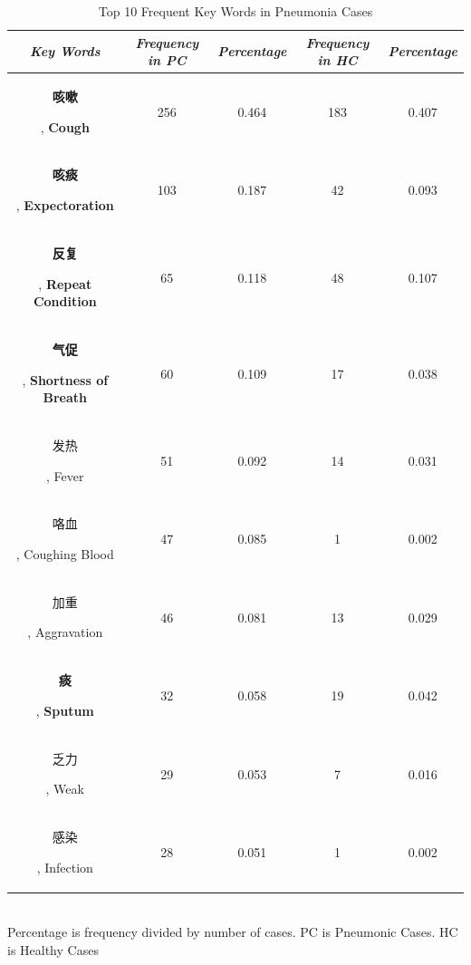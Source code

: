 \documentclass[journal]{IEEEtran}
\begin{document}
\begin{table}[htb]
\vspace{-0cm}
\caption{Top 10 Frequent Key Words in Pneumonia Cases}
\vspace{-0cm}
\begin{center}
\begin{tabular}{|c|c|c|c|c|}
    \hline
    \textbf{\textit{Key Words}} & \textbf{\textit{Frequency in PC}} & \textbf{\textit{Percentage}}& \textbf{\textit{Frequency in HC}}& \textbf{\textit{Percentage}} \\
\hline
\begin{CJK}{UTF8}{gbsn}\textbf{咳嗽}\end{CJK}, \textbf{Cough} & 256 & 0.464 & 183 & 0.407\\
\begin{CJK}{UTF8}{gbsn}\textbf{咳痰}\end{CJK}, \textbf{Expectoration} & 103 & 0.187 & 42 & 0.093\\
\begin{CJK}{UTF8}{gbsn}\textbf{反复}\end{CJK}, \textbf{Repeat Condition} & 65 & 0.118 & 48 & 0.107\\
\begin{CJK}{UTF8}{gbsn}\textbf{气促}\end{CJK}, \textbf{Shortness of Breath} & 60 & 0.109 & 17 & 0.038\\
\begin{CJK}{UTF8}{gbsn}发热\end{CJK}, Fever & 51 & 0.092 & 14 & 0.031\\
\begin{CJK}{UTF8}{gbsn}咯血\end{CJK}, Coughing Blood & 47 & 0.085 & 1 & 0.002\\
\begin{CJK}{UTF8}{gbsn}加重\end{CJK}, Aggravation & 46 & 0.081 & 13 & 0.029\\
\begin{CJK}{UTF8}{gbsn}\textbf{痰}\end{CJK}, \textbf{Sputum} & 32 & 0.058 & 19 & 0.042\\
\begin{CJK}{UTF8}{gbsn}乏力\end{CJK}, Weak& 29 & 0.053 & 7 & 0.016\\
\begin{CJK}{UTF8}{gbsn}感染\end{CJK}, Infection& 28 & 0.051 & 1 & 0.002\\

\hline
\end{tabular}
\vspace{0.1cm}
\label{frequency1}\\
\footnotesize{Percentage is frequency divided by number of cases. PC is Pneumonic Cases. HC is Healthy Cases}

\end{center}
\vspace{-0.0cm}
\end{table}
\end{document}
